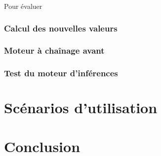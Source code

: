 \documentclass[a4paper,10pt]{report}
\begin{document}
    Pour évaluer 
    \subsection{Calcul des nouvelles valeurs}
    \subsection{Moteur à chaînage avant}
    \subsection{Test du moteur d'inférences}
\chapter{Scénarios d'utilisation}
\chapter*{Conclusion}

  
\end{document}
